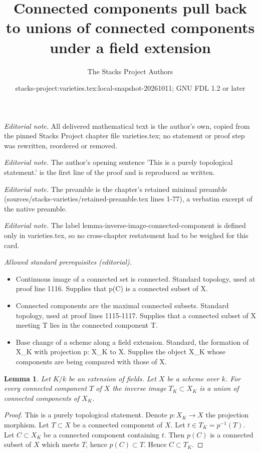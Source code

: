 \documentclass[10pt,a4paper]{amsart}
\title{Connected components pull back to unions of connected components under a field extension}
\author{The Stacks Project Authors}
\date{stacks-project:varieties.tex:local-snapshot-20261011; GNU FDL 1.2 or later}
\theoremstyle{plain}
\newtheorem{lemma}[subsection]{Lemma}
\theoremstyle{definition}
\theoremstyle{remark}
\numberwithin{equation}{subsection}
\begin{document}
\maketitle
\noindent\textit{Editorial note.} All delivered mathematical text is the author's own, copied from the pinned Stacks Project chapter file varieties.tex; no statement or proof step was rewritten, reordered or removed.\par\medskip
\noindent\textit{Editorial note.} The author's opening sentence 'This is a purely topological statement.' is the first line of the proof and is reproduced as written.\par\medskip
\noindent\textit{Editorial note.} The preamble is the chapter's retained minimal preamble (sources/stacks-varieties/retained-preamble.tex lines 1-77), a verbatim excerpt of the native preamble.\par\medskip
\noindent\textit{Editorial note.} The label lemma-inverse-image-connected-component is defined only in varieties.tex, so no cross-chapter restatement had to be weighed for this card.\par\medskip
\noindent\textit{Allowed standard prerequisites (editorial).}\begin{itemize}
\item Continuous image of a connected set is connected. Standard topology, used at proof line 1116. Supplies that p(C) is a connected subset of X.
\item Connected components are the maximal connected subsets. Standard topology, used at proof lines 1115-1117. Supplies that a connected subset of X meeting T lies in the connected component T.
\item Base change of a scheme along a field extension. Standard, the formation of X\_K with projection p: X\_K to X. Supplies the object X\_K whose components are being compared with those of X.
\end{itemize}\medskip
\begin{lemma}
\label{lemma-inverse-image-connected-component}
Let $K/k$ be an extension of fields.
Let $X$ be a scheme over $k$.
For every connected component $T$ of $X$ the inverse image
$T_K \subset X_K$ is a union of connected components of $X_K$.
\end{lemma}

\begin{proof}
This is a purely topological statement.
Denote $p : X_K \to X$ the projection morphism.
Let $T \subset X$ be a connected component of $X$.
Let $t \in T_K = p^{-1}(T)$. Let $C \subset X_K$ be a connected component
containing $t$. Then $p(C)$ is a connected subset of $X$
which meets $T$, hence $p(C) \subset T$. Hence $C \subset T_K$.
\end{proof}
\end{document}
